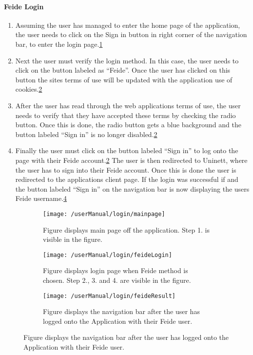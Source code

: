 \paragraph{Feide Login}
\begin{enumerate}
	\item Assuming the user has managed to enter the home page of the application, the user needs to click on the Sign in button in right corner of the navigation bar, to enter the login page.\ref{fig:feideMainPage}
	\item Next the user must verify the login method. In this case, the user needs to click on the button labeled as “Feide”. Once the user has clicked on this button the sites terms of use will be updated with the application use of cookies.\ref{fig:feideLogin}
	\item After the user has read through the web applications terms of use, the user needs to verify that they have accepted these terms by checking the radio button. Once this is done, the radio button gets a blue background and the button labeled “Sign in” is no longer disabled.\ref{fig:feideLogin}
 	\item Finally the user must click on the button labeled “Sign in” to log onto the page with their Feide account.\ref{fig:feideLogin} The user is then redirected to Uninett, where the user has to sign into their Feide account. Once this is done the user is redirected to the applications client page. If the login was successful if and the button labeled “Sign in” on the navigation bar is now displaying the users Feide username.\ref{fig:feideResult}
\end{enumerate}
\begin{figure}[H]
    \centering
    \begin{subfigure}{0.60\linewidth}
        \texttt{[image: /userManual/login/mainpage]}
       	\caption{Figure displays main page off the application. Step 1. is visible in the figure.}
		\label{fig:feideMainPage}	
    \end{subfigure}
    \begin{subfigure}{0.60\linewidth}
        \texttt{[image: /userManual/login/feideLogin]}
      	\caption{Figure displays login page when Feide method is chosen. Step 2., 3. and 4. are visible in the figure.}
		\label{fig:feideLogin}	
    \end{subfigure}
     \begin{subfigure}{0.60\linewidth}
        \texttt{[image: /userManual/login/feideResult]}
      	\caption{Figure displays the navigation bar after the user has logged onto the Application with their Feide user.}
		\label{fig:feideResult}	
    \end{subfigure}
\end{figure}